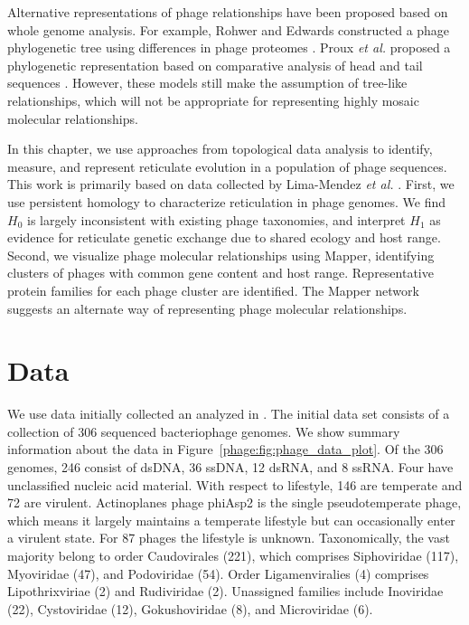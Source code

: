 Alternative representations of phage relationships have been proposed based on whole genome analysis.
For example, Rohwer and Edwards constructed a phage phylogenetic tree using differences in phage proteomes \cite{Rohwer:2002uo}.
Proux \emph{et al.} proposed a phylogenetic representation based on comparative analysis of head and tail sequences \cite{Proux:2002gj}.
However, these models still make the assumption of tree-like relationships, which will not be appropriate for representing highly mosaic molecular relationships.

In this chapter, we use approaches from topological data analysis to identify, measure, and represent reticulate evolution in a population of phage sequences.
This work is primarily based on data collected by Lima-Mendez \emph{et al.} \cite{LimaMendez:2008ki}.
First, we use persistent homology to characterize reticulation in phage genomes.
We find $H_0$ is largely inconsistent with existing phage taxonomies, and interpret $H_1$ as evidence for reticulate genetic exchange due to shared ecology and host range.
Second, we visualize phage molecular relationships using Mapper, identifying clusters of phages with common gene content and host range.
Representative protein families for each phage cluster are identified.
The Mapper network suggests an alternate way of representing phage molecular relationships.

\section{Data}

We use data initially collected an analyzed in \cite{LimaMendez:2008ki}.
The initial data set consists of a collection of 306 sequenced bacteriophage genomes.
We show summary information about the data in Figure~\ref{phage:fig:phage_data_plot}.
Of the 306 genomes, 246 consist of dsDNA, 36 ssDNA, 12 dsRNA, and 8 ssRNA.
Four have unclassified nucleic acid material.
With respect to lifestyle, 146 are temperate and 72 are virulent.
Actinoplanes phage phiAsp2 is the single pseudotemperate phage, which means it largely maintains a temperate lifestyle but can occasionally enter a virulent state.
For 87 phages the lifestyle is unknown.
Taxonomically, the vast majority belong to order Caudovirales (221), which comprises Siphoviridae (117), Myoviridae (47), and Podoviridae (54). 
Order Ligamenviralies (4) comprises Lipothrixviriae (2) and Rudiviridae (2).
Unassigned families include Inoviridae (22), Cystoviridae (12), Gokushoviridae (8), and Microviridae (6).

